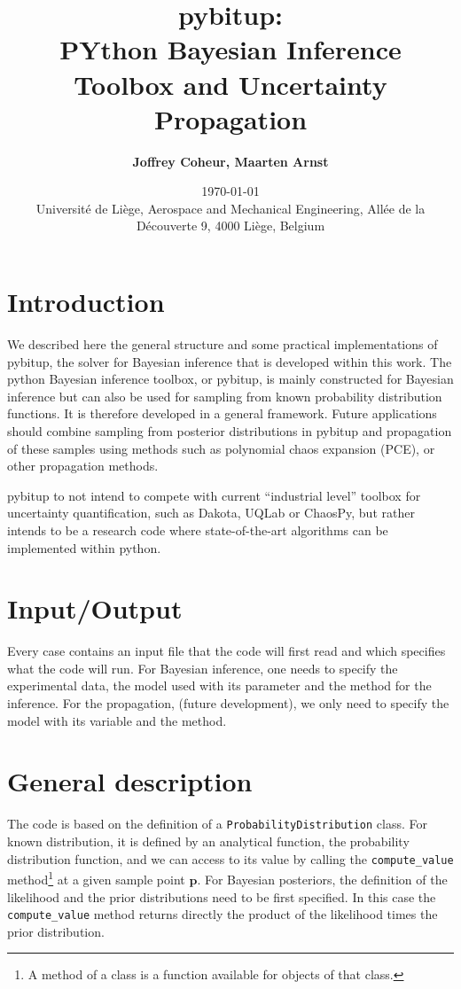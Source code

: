 \documentclass[a4paper,11pt]{article}
\title{\huge \textbf{pybitup: \\ PYthon Bayesian Inference Toolbox and Uncertainty Propagation}}
\author{\textbf{Joffrey Coheur, Maarten Arnst}}
\date{\today \\ 
\vspace{50pt}
Universit\'e de Li\`ege, Aerospace and Mechanical Engineering, All\'ee de la D\'ecouverte 9, 4000 Li\`ege, Belgium}
\begin{document}
\begin{titlepage}
\maketitle
\end{titlepage}

\section{Introduction} 

We described here the general structure and some practical implementations of pybitup, the solver for Bayesian inference that is developed within this work. The python Bayesian inference toolbox, or pybitup, is mainly constructed for Bayesian inference but can also be used for sampling from known probability distribution functions. It is therefore developed in a general framework. Future applications should combine sampling from posterior distributions in pybitup and propagation of these samples using methods such as polynomial chaos expansion (PCE), or other propagation methods. 

pybitup to not intend to compete with current ``industrial level'' toolbox for uncertainty quantification, such as Dakota, UQLab or ChaosPy, but rather intends to be a research code where state-of-the-art algorithms can be implemented within python.




 

\section{Input/Output} 

Every case contains an input file that the code will first read and which specifies what the code will run. For Bayesian inference, one needs to specify the experimental data, the model used with its parameter and the method for the inference. For the propagation, (future development), we only need to specify the model with its variable and the method. 


\section{General description} 

The code is based on the definition of a \texttt{ProbabilityDistribution} class. For known distribution, it is defined by an analytical function, the probability distribution function, and we can access to its value by calling the \texttt{compute\_value} method\footnote{A method of a class is a function available for objects of that class.} at a given sample point $\textbf{p}$. For Bayesian posteriors, the definition of the likelihood and the prior distributions need to be first specified. In this case the \texttt{compute\_value} method returns directly the product of the likelihood times the prior distribution. 
\end{document}

